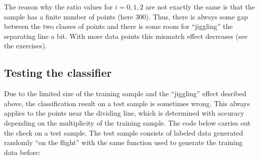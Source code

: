 \documentclass[letterpaper,10pt,english]{jupyterBook}
\begin{document}
\begin{sphinxVerbatim}[commandchars=\\\{\}]
[2.099 2.073 2.086]
\end{sphinxVerbatim}

\sphinxAtStartPar
The reason why the ratio values for \(i=0,1,2\) are not exactly the same is that the sample has a finite number of points (here 300). Thus, there is always some gap between the two classes of points and there is some room for “jiggling” the separating line a bit. With more data points this mismatch effect decreases (see the exercises).


\subsection{Testing the classifier}
\label{\detokenize{docs/perceptron:testing-the-classifier}}
\sphinxAtStartPar
Due to the limited size of the training sample and the “jiggling” effect desribed above, the classification result on a test sample is sometimes wrong. This always applies to the points near the dividing line, which is determined with accuracy depending on the multiplicity of the training sample. The code below carries out the check on a test sample. The test sample consists of labeled data generated randomly “on the flight” with the same function  used to generate the training data before:

\begin{sphinxVerbatim}[commandchars=\\\{\}]
 
              
               
         \PYG{p}{[}\PYG{p}{]} 
                              
         \PYG{p}{[}\PYG{p}{]} 
\end{sphinxVerbatim}
\end{document}
